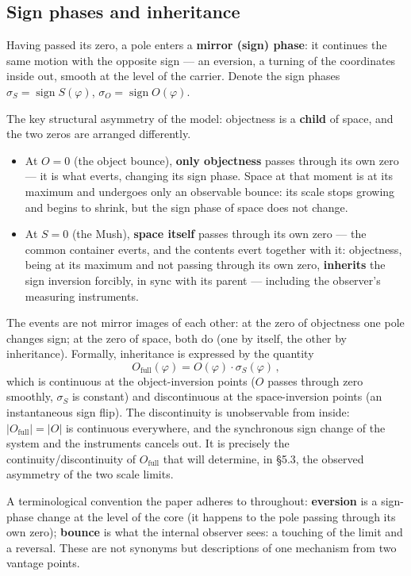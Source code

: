 \documentclass{article}
\begin{document}
\subsection{Sign phases and inheritance}

Having passed its zero, a pole enters a \textbf{mirror (sign) phase}: it continues the same motion with the opposite sign --- an eversion, a turning of the coordinates inside out, smooth at the level of the carrier. Denote the sign phases $\sigma_S = \operatorname{sign} S(\varphi)$, $\sigma_O = \operatorname{sign} O(\varphi)$.

The key structural asymmetry of the model: objectness is a \textbf{child} of space, and the two zeros are arranged differently.
\begin{itemize}
  \item At $O = 0$ (the object bounce), \textbf{only objectness} passes through its own zero --- it is what everts, changing its sign phase. Space at that moment is at its maximum and undergoes only an observable bounce: its scale stops growing and begins to shrink, but the sign phase of space does not change.
  \item At $S = 0$ (the Mush), \textbf{space itself} passes through its own zero --- the common container everts, and the contents evert together with it: objectness, being at its maximum and not passing through its own zero, \textbf{inherits} the sign inversion forcibly, in sync with its parent --- including the observer's measuring instruments.
\end{itemize}

The events are not mirror images of each other: at the zero of objectness one pole changes sign; at the zero of space, both do (one by itself, the other by inheritance). Formally, inheritance is expressed by the quantity
\begin{equation}
O_{\text{full}}(\varphi) = O(\varphi)\cdot\sigma_S(\varphi)\,,
\end{equation}
which is continuous at the object-inversion points ($O$ passes through zero smoothly, $\sigma_S$ is constant) and discontinuous at the space-inversion points (an instantaneous sign flip). The discontinuity is unobservable from inside: $|O_{\text{full}}| = |O|$ is continuous everywhere, and the synchronous sign change of the system and the instruments cancels out. It is precisely the continuity/discontinuity of $O_{\text{full}}$ that will determine, in \S5.3, the observed asymmetry of the two scale limits.

A terminological convention the paper adheres to throughout: \textbf{eversion} is a sign-phase change at the level of the core (it happens to the pole passing through its own zero); \textbf{bounce} is what the internal observer sees: a touching of the limit and a reversal. These are not synonyms but descriptions of one mechanism from two vantage points.
\end{document}
